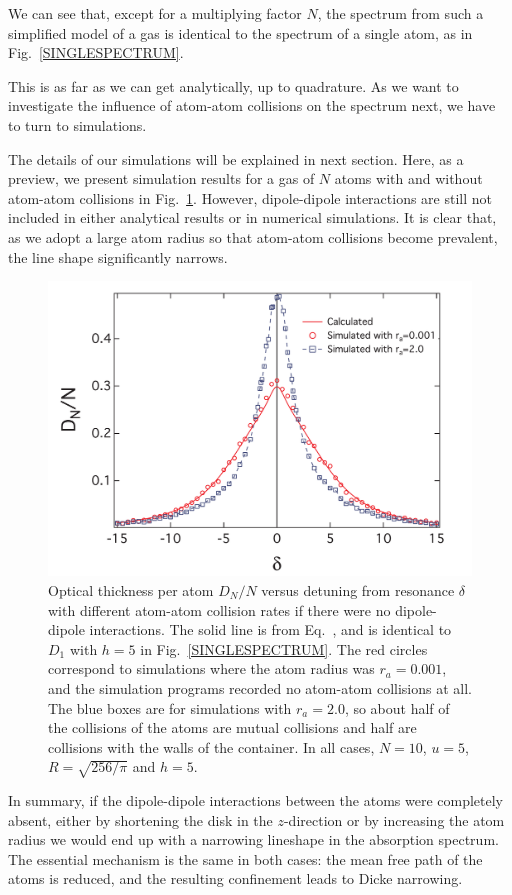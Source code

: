 We can see that, except for a multiplying factor $N$, the spectrum from such a simplified model of a gas is identical to the spectrum of a single atom, as in Fig.~\ref{SINGLESPECTRUM}. 
 
This is as far as we can get analytically, up to quadrature. As we want to investigate the influence of atom-atom collisions on the spectrum next, we have to turn to simulations.

The details of our simulations will be explained in next section. Here, as a preview, we present simulation results for a gas of $N$ atoms with and without atom-atom collisions in Fig.~\ref{COLLISION}. However, dipole-dipole interactions are still not included in either analytical results or in numerical simulations. It is clear that, as we adopt a large atom radius so that atom-atom collisions become prevalent, the line shape significantly narrows.

\begin{figure}[h!]
\begin{center}
\includegraphics[width=\textwidth]{COLLISION.pdf}
\end{center}
\caption{Optical thickness per atom $D_N/N$ versus detuning from resonance $\delta$ with different atom-atom collision rates if there were no dipole-dipole interactions. The solid line is from Eq.~, and is identical to $D_1$ with $h=5$ in Fig.~\ref{SINGLESPECTRUM}. The red circles correspond to simulations where the atom radius was $r_a=0.001$, and the simulation programs recorded no atom-atom collisions at all. The blue boxes are for simulations with $r_a=2.0$, so about half of the collisions of the atoms are mutual collisions and half are collisions with the walls of the container. In all cases, $N=10$, $u=5$, $R=\sqrt{256/\pi}$ and $h=5$.}
\label{COLLISION}
\end{figure}
In summary, if the dipole-dipole interactions between the atoms were completely absent, either by shortening the disk in the $z$-direction or by increasing the atom radius we would end up with a narrowing lineshape in the absorption spectrum. The essential mechanism is the same in both cases: the mean free path of the atoms is reduced, and the resulting confinement leads to Dicke narrowing.

